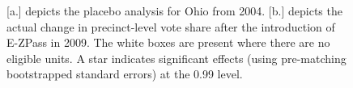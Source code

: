 \documentclass[11.0pt]{article}
\theoremstyle{definition}
\begin{document}
\begin{figure}[htb!]%
    \centering
    \quad
   \caption{[a.] depicts the placebo analysis for Ohio from 2004. [b.] depicts the actual change in precinct-level vote share after the introduction of E-ZPass in 2009. The white boxes are present where there are no eligible units. A star indicates significant effects (using pre-matching bootstrapped standard errors) at the 0.99 level.}
   \label{ohio}
\end{figure}


\begin{singlespace}

\nocite{*}

\end{singlespace}








\end{document}
